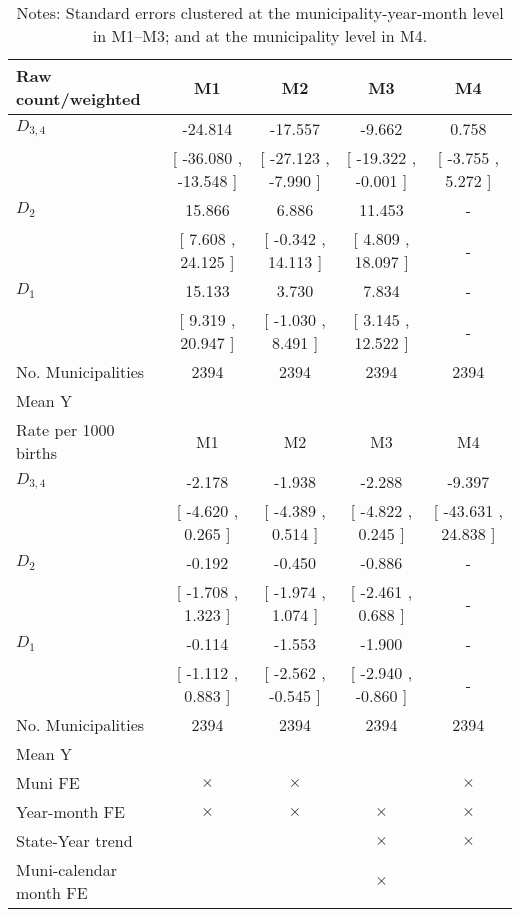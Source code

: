 \begin{table}[!ht]
\centering
\caption{Effects of Drought on anyprenat}\label{tab:twfe_anyprenat}
\fontsize{10pt}{12pt}\selectfont
\begin{tabular}{lcccc}
\toprule
  Raw count/weighted &\multicolumn{1}{c}{M1}&\multicolumn{1}{c}{M2}&\multicolumn{1}{c}{M3}&\multicolumn{1}{c}{M4} \\
\midrule
 $ D_{3,4} $ &   -24.814 &   -17.557 &    -9.662 &     0.758 \\ 
 & [   -36.080 ,   -13.548 ] & [   -27.123 ,    -7.990 ] & [   -19.322 ,    -0.001 ] & [    -3.755 ,     5.272 ] \\ 
\addlinespace
 $ D_2 $ &    15.866 &     6.886 &    11.453 & - \\ 
 & [     7.608 ,    24.125 ] & [    -0.342 ,    14.113 ] & [     4.809 ,    18.097 ] & - \\ 
\addlinespace
 $ D_1 $ &    15.133 &     3.730 &     7.834 & - \\ 
 & [     9.319 ,    20.947 ] & [    -1.030 ,     8.491 ] & [     3.145 ,    12.522 ] & - \\ 
\addlinespace
\midrule
  No. Municipalities & 2394 & 2394 & 2394 & 2394  \\
  Mean Y &  &  &  &   \\
\addlinespace
\midrule
  Rate per 1000 births &\multicolumn{1}{c}{M1}&\multicolumn{1}{c}{M2}&\multicolumn{1}{c}{M3}&\multicolumn{1}{c}{M4} \\
\midrule
 $ D_{3,4} $ &    -2.178 &    -1.938 &    -2.288 &    -9.397 \\ 
 & [    -4.620 ,     0.265 ] & [    -4.389 ,     0.514 ] & [    -4.822 ,     0.245 ] & [   -43.631 ,    24.838 ] \\ 
\addlinespace
 $ D_2 $ &    -0.192 &    -0.450 &    -0.886 & - \\ 
 & [    -1.708 ,     1.323 ] & [    -1.974 ,     1.074 ] & [    -2.461 ,     0.688 ] & - \\ 
\addlinespace
 $ D_1 $ &    -0.114 &    -1.553 &    -1.900 & - \\ 
 & [    -1.112 ,     0.883 ] & [    -2.562 ,    -0.545 ] & [    -2.940 ,    -0.860 ] & - \\ 
\midrule
  No. Municipalities & 2394 & 2394 & 2394 & 2394  \\
  Mean Y &  &  &  &   \\
  Muni FE & $ \times $ & $ \times $ &  & $ \times $  \\
  Year-month FE & $ \times $ & $ \times $ & $ \times $ & $ \times $ \\
  State-Year trend &  &  & $ \times $ & $ \times $ \\
  Muni-calendar month FE &  &  & $ \times $ & \\
\bottomrule
\end{tabular}
\caption*{\footnotesize{Notes: Standard errors clustered at the municipality-year-month level in M1--M3; and at the municipality level in M4.}}
\end{table}

